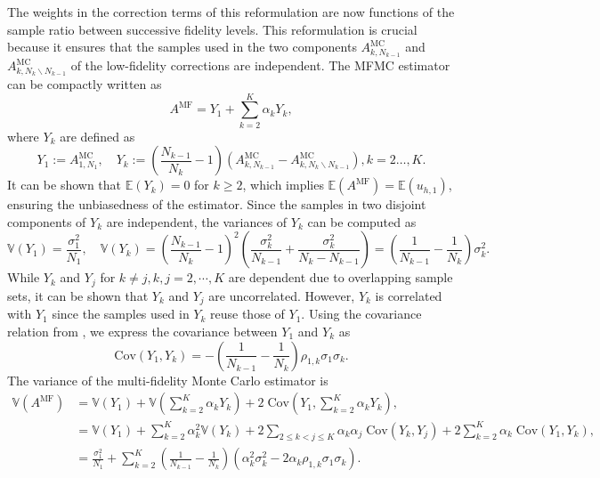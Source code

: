 \documentclass[final,3p,times,11pt]{elsarticle}
\begin{document}
%
The weights in the correction terms of this reformulation  are now functions of the sample ratio between successive fidelity levels. This reformulation is crucial because it ensures that the samples used in  the two components $A_{k,N_{k-1}}^{\text{MC}}$ and $A_{k,N_k\backslash N_{k-1}}^{\text{MC}}$ of the low-fidelity corrections are independent. The MFMC estimator can be compactly written as
%
\[
A^{\text{MF}} = Y_1 + \sum_{k=2}^K \alpha_k Y_k,
\]
%
where $Y_k$ are defined as
%
\[
Y_1 :=A^{\text{MC}}_{1,N_1},\quad Y_k:=\left(\frac{N_{k-1}}{N_{k}}-1\right)\left(A_{k,N_{k-1}}^{\text{MC}}- A_{k,N_k\backslash N_{k-1}}^{\text{MC}}\right), k=2\ldots, K.
\]
%
It can be shown that $\mathbb{E}(Y_k) = 0$ for $k\ge 2$, which implies $\mathbb{E}(A^{\text{MF}}) = \mathbb{E}(u_{h,1})$, ensuring the unbiasedness of the estimator. Since the samples in two disjoint components of $Y_k$ are independent, the variances of $Y_k$ can be computed as
%
\[
\mathbb{V}\left(Y_1\right) = \frac{\sigma_1^2}{N_1}, \quad \mathbb{V}\left(Y_k\right) = \left(\frac{N_{k-1}}{N_{k}}-1\right)^2\left(\frac{\sigma_k^2}{N_{k-1}}+\frac{\sigma_k^2}{N_k-N_{k-1}}\right) = \left(\frac{1}{N_{k-1}} - \frac{1}{N_k}\right)\sigma_k^2.
\]
%
While $Y_k$ and $Y_j$ for $k\neq j, k,j=2,\cdots, K$ are dependent due to overlapping sample sets, it can be shown that $Y_k$ and $Y_j$ are uncorrelated. However, $Y_k$  is correlated with $Y_1$ since the samples used in $Y_k$ reuse those of $Y_1$. Using the covariance relation from \cite[Lemma~3.2]{PeWiGu:2016}, we express the covariance between $Y_1$ and $Y_k$ as
\[
\text{Cov}(Y_1,Y_k) = - \left(\frac{1}{N_{k-1}} - \frac{1}{N_k}\right)\rho_{1,k}\sigma_1\sigma_k.
\]
The variance of the multi-fidelity Monte Carlo estimator is
\begin{align}
    \nonumber
    \mathbb{V}\left(A^{\text{MF}}\right) &= \mathbb{V}\left(Y_1\right) + \mathbb{V}\left(\sum_{k=2}^K \alpha_kY_k\right)+2\;\text{Cov}\left(Y_1,\sum_{k=2}^K \alpha_k Y_k \right),\\
    \nonumber
    &=\mathbb{V}\left(Y_1\right) + \sum_{k=2}^K \alpha_k^2 \mathbb{V}\left(Y_k\right)+2\sum_{2\le k<j\le K} \alpha_k\alpha_j\; \text{Cov}(Y_k,Y_j) +2\sum_{k=2}^K \alpha_k\;\text{Cov}\left(Y_1, Y_k\right),\\
    \label{eq:MFMC_variance}
    &=\frac{\sigma_1^2}{N_1} + \sum_{k=2}^K \left(\frac{1}{N_{k-1}} - \frac{1}{N_k}\right)\left(\alpha_k^2\sigma_k^2 - 2\alpha_k\rho_{1,k}\sigma_1\sigma_k\right).
\end{align}
\end{document}
